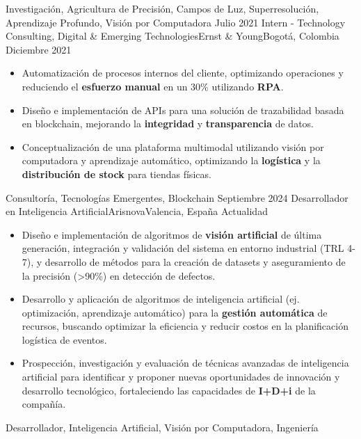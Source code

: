 \begin{experiences}
{\begin{itemize}
      \end{itemize}
    }
    {Investigación, Agricultura de Precisión, Campos de Luz, Superresolución, Aprendizaje Profundo, Visión por Computadora}
  \emptySeparator
  \experience
    {Julio 2021} {Intern - Technology Consulting, Digital \& Emerging Technologies}{Ernst \& Young}{Bogotá, Colombia}
    {Diciembre 2021}    {
      \begin{itemize}
        \item Automatización de procesos internos del cliente, optimizando operaciones y reduciendo el \textbf{esfuerzo manual} en un 30\% utilizando \textbf{RPA}.
        \item Diseño e implementación de APIs para una solución de trazabilidad basada en blockchain, mejorando la \textbf{integridad} y \textbf{transparencia} de datos.
        \item Conceptualización de una plataforma multimodal utilizando visión por computadora y aprendizaje automático, optimizando la \textbf{logística} y la \textbf{distribución de stock} para tiendas físicas.
      \end{itemize}
    }
    {Consultoría, Tecnologías Emergentes, Blockchain}
  \emptySeparator
  \experience
    {Septiembre 2024} {Desarrollador en Inteligencia Artificial}{Arisnova}{Valencia, España}
    {Actualidad}    {
      \begin{itemize}
        \item Diseño e implementación de algoritmos de \textbf{visión artificial} de última generación, integración y validación del sistema en entorno industrial (TRL 4-7), y desarrollo de métodos para la creación de datasets y aseguramiento de la precisión (>90\%) en detección de defectos.
        \item Desarrollo y aplicación de algoritmos de inteligencia artificial (ej. optimización, aprendizaje automático) para la \textbf{gestión automática} de recursos, buscando optimizar la eficiencia y reducir costos en la planificación logística de eventos.
        \item Prospección, investigación y evaluación de técnicas avanzadas de inteligencia artificial para identificar y proponer nuevas oportunidades de innovación y desarrollo tecnológico, fortaleciendo las capacidades de \textbf{I+D+i} de la compañía.
      \end{itemize}
    }
    {Desarrollador, Inteligencia Artificial, Visión por Computadora, Ingeniería}
\end{experiences}

